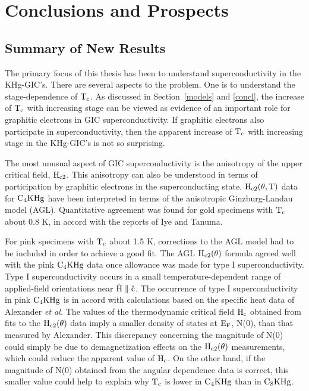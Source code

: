 \setcounter{chapter}{6}
\chapter{Conclusions and Prospects}
\pagestyle{headings}
\label{final}

\section{Summary of New Results}
\label{newres}

        The  primary focus  of  this   thesis    has been to     understand
superconductivity  in  the KHg-GIC's.  There  are  several  aspects to  the
problem.   One is  to understand  the  stage-dependence of $\rm  T_c$.   As
discussed  in Section~\ref{models} and  \ref{concl}, the  increase  of $\rm
T_c$ with increasing stage can be  viewed as evidence  of an important role
for graphitic electrons in  GIC superconductivity.   If graphitic electrons
also participate in  superconductivity,  then the apparent increase of $\rm
T_c$ with increasing stage in the KHg-GIC's is not so surprising.

        The most unusual aspect of GIC superconductivity is the anisotropy
 of  the upper critical field, $\rm H_{c2}$.  This anisotropy  can
also be understood in terms of participation by graphitic electrons in the
superconducting state.\cite{M143}  $\rm H_{c2}(\theta, T)$  data for $\rm
C_4KHg$ have been interpreted in terms of the anisotropic Ginzburg-Landau
model (AGL).\cite{kats69,morris72,tilley65}  Quantitative agreement was
found for gold specimens with $\rm T_c$ about 0.8 K, in accord with the
reports of Iye and Tanuma.\cite{iye82}

        For pink specimens with $\rm T_c$ about  1.5 K,  corrections to the
AGL model had to be included in order to achieve a good fit.  The  AGL $\rm
H_{c2}(\theta)$ formula agreed  well with the pink  $\rm C_4KHg$  data once
allowance was made for type I  superconductivity.  Type I superconductivity
occurs in a small temperature-dependent range of applied-field orientations
near  $\rm  \vec{H}   \parallel \hat{c}$.  The    occurrence   of  type   I
superconductivity in pink $\rm C_4KHg$ is in accord with calculations based
on the specific heat data of Alexander {\em et al.\/}\cite{alexander81} The
values of  the thermodynamic critical field $\rm  H_{c}$ obtained from fits
to the $\rm H_{c2}(\theta)$ data imply a smaller density of states  at $\rm
E_F$,   N(0),  than that   measured  by Alexander.\cite{alexander81}   This
discrepancy   concerning the magnitude   of  N(0) could  simply  be  due to
demagnetization  effects on the $\rm H_{c2}(\theta)$   measurements,  which
could reduce the apparent value of $\rm H_{c}$.  On the other  hand, if the
magnitude of N(0)  obtained from  the  angular dependence  data is correct,
this smaller  value could help to explain  why $\rm T_c$  is lower  in $\rm
C_4KHg$ than in $\rm C_8KHg$.

